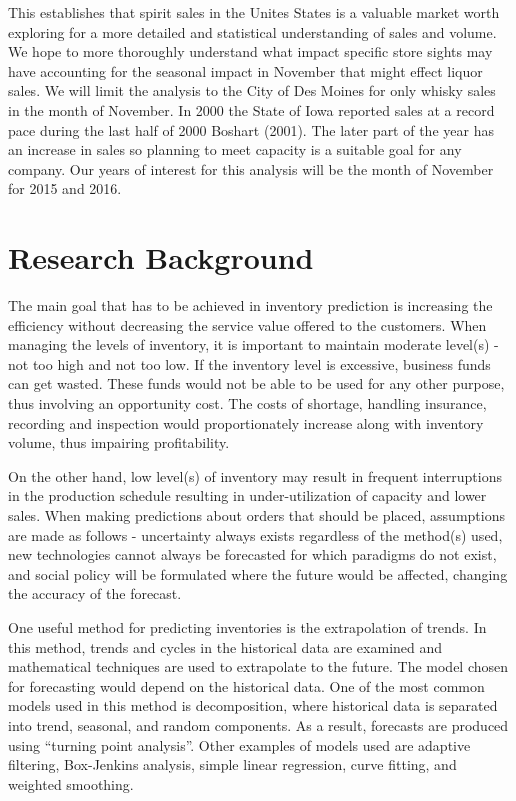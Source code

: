 \documentclass[]{elsarticle} %
\begin{document}
This establishes that spirit sales in the Unites States is a valuable
market worth exploring for a more detailed and statistical understanding
of sales and volume. We hope to more thoroughly understand what impact
specific store sights may have accounting for the seasonal impact in
November that might effect liquor sales. We will limit the analysis to
the City of Des Moines for only whisky sales in the month of November.
In 2000 the State of Iowa reported sales at a record pace during the
last half of 2000 Boshart (2001). The later part of the year has an
increase in sales so planning to meet capacity is a suitable goal for
any company. Our years of interest for this analysis will be the month
of November for 2015 and 2016.

\section{Research Background}\label{research-background}

The main goal that has to be achieved in inventory prediction is
increasing the efficiency without decreasing the service value offered
to the customers. When managing the levels of inventory, it is important
to maintain moderate level(s) - not too high and not too low. If the
inventory level is excessive, business funds can get wasted. These funds
would not be able to be used for any other purpose, thus involving an
opportunity cost. The costs of shortage, handling insurance, recording
and inspection would proportionately increase along with inventory
volume, thus impairing profitability.

On the other hand, low level(s) of inventory may result in frequent
interruptions in the production schedule resulting in under-utilization
of capacity and lower sales. When making predictions about orders that
should be placed, assumptions are made as follows - uncertainty always
exists regardless of the method(s) used, new technologies cannot always
be forecasted for which paradigms do not exist, and social policy will
be formulated where the future would be affected, changing the accuracy
of the forecast.

One useful method for predicting inventories is the extrapolation of
trends. In this method, trends and cycles in the historical data are
examined and mathematical techniques are used to extrapolate to the
future. The model chosen for forecasting would depend on the historical
data. One of the most common models used in this method is
decomposition, where historical data is separated into trend, seasonal,
and random components. As a result, forecasts are produced using
``turning point analysis''. Other examples of models used are adaptive
filtering, Box-Jenkins analysis, simple linear regression, curve
fitting, and weighted smoothing.
\end{document}
